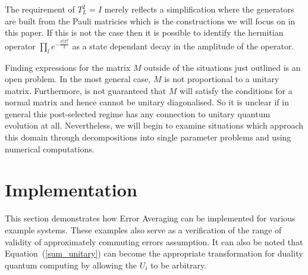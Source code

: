 \documentclass[aps,pra,twocolumn,superscriptaddress,numerical,floatfix]{revtex4-1}
\begin{document}
The requirement of $T_L^2=I$ merely reflects a simplification where the generators are built from the Pauli matricies which is the constructions we will focus on in this paper.  If this is not the case then it is possible to identify the hermitian operator $\prod_l e^{-\frac{\sigma_l^2 T_l^2}{2}}$ as a state dependant decay in the amplitude of the operator.




Finding expressions for the matrix $M$ outside of the situations just outlined is an open problem.  In the most general case, $M$ is not proportional to a unitary matrix.  Furthermore, is not guaranteed that $M$ will satisfy the conditions for a normal matrix and hence cannot be unitary diagonalised.  So it is unclear if in general this post-selected regime has any connection to unitary quantum evolution at all.  Nevertheless, we will begin to examine situations which approach this domain through decompositions into single parameter problems and using numerical computations.

\section{Implementation\label{implementation}}

This section demonstrates how Error Averaging can be implemented for various example systems. These examples also serve as a verification of the range of validity of approximately commuting errors assumption. It can also be noted that Equation~(\ref{sum_unitary}) can become the appropriate transformation for duality quantum computing by allowing the $U_{i}$ to be arbitrary\cite{dualityQC}.
\end{document}
